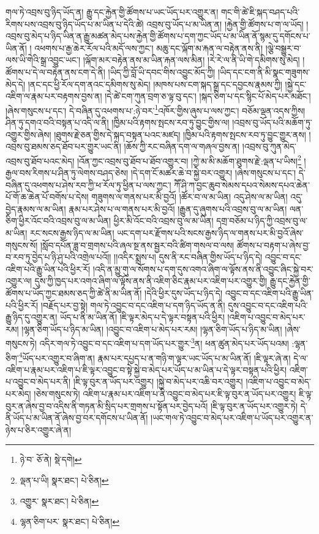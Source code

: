 གལ་ཏེ་འབྲས་བུ་ཉིད་ཡོད་ན། རྒྱུ་དང་རྐྱེན་གྱི་ཚོགས་པ་ཡང་ཡོད་པར་འགྱུར་ན། གང་གི་ཚེ་ཇི་སྐད་བཤད་པའི་རིགས་པས་འབྲས་བུ་ཉིད་ཡོད་པ་མ་ཡིན་པ་དེའི་ཚེ། འབྲས་བུ་ཡོད་པ་མ་ཡིན་ན། །རྐྱེན་གྱི་ཚོགས་པ་ག་ལ་ཡོད། །འབྲས་བུ་མེད་པ་ཉིད་ཡིན་ན་རྒྱུ་མཚན་མེད་པས་རྐྱེན་གྱི་ཚོགས་པ་དག་ཀྱང་ཡོད་པ་མ་ཡིན་ནོ་སྙམ་དུ་དགོངས་པ་ཡིན་ནོ། །
འཕགས་པ་རྒྱ་ཆེར་རོལ་པའི་མདོ་ལས་ཀྱང་། མཆུ་དང་ལྐོག་མ་རྐན་ལ་བརྟེན་ནས་ནི། །ལྕེ་བསྒྱུར་བ་ལས་ཡི་གེའི་སྒྲ་འབྱུང་ཡང་། །ལྐོག་མར་བརྟེན་ནས་མ་ཡིན་རྐན་ལས་མིན། །རེ་རེ་ལ་ནི་ཡི་གེ་དམིགས་སུ་མེད། །ཚོགས་པ་དེ་ལ་བརྟེན་ནས་ངག་དེ་ནི། །ཡིད་ཀྱི་བློ་ཡི་དབང་གིས་འབྱུང་མོད་ཀྱི། །ཡིད་དང་ངག་ནི་མི་སྣང་གཟུགས་མེད་དེ། །ནང་དང་ཕྱི་རོལ་དག་ནའང་དམིགས་སུ་མེད། །མཁས་པས་ངག་སྐད་སྒྲ་དང་དབྱངས་རྣམས་ཀྱི། །སྐྱེ་དང་འཇིག་ལ་རྣམ་པར་བརྟགས་བྱས་ན། །དེ་ཚེ་ངག་ཀུན་བྲག་ཅ་ལྟ་བུ་དང་། །སྐད་ཅིག་པ་དང་སྙིང་པོ་མེད་པར་མཐོང་། །ཞེས་གསུངས་པ་དང་། དེ་བཞིན་དུ་འཕགས་པ་:ཉེ་བར་\footnote{ཉེ་བ་  ཅོ་ནེ།  སྡེ་དགེ། }འཁོར་གྱིས་ཞུས་པ་ལས་ཀྱང་། བཅོམ་ལྡན་འདས་ཀྱིས། ཤིན་ཏུ་དགའ་བའི་བསྟན་པ་འདི་ལ་ནི། །ཁྱིམ་པའི་རྟགས་སྤངས་རབ་ཏུ་བྱུང་གྱིས་ལ། །འབྲས་བུ་ཡོད་པའི་མཆོག་ཏུ་འགྱུར་གྱིས་ཞེས། །ཐུགས་རྗེ་ཅན་གྱིས་དེ་སྐད་བསྟན་པའང་མཛད། །ཁྱིམ་པའི་རྟགས་སྤངས་རབ་ཏུ་བྱུང་གྱུར་ནས། །འབྲས་བུ་ཐམས་ཅད་ཐོབ་པར་གྱུར་ཡང་ནི། །ཆོས་ཀྱི་རང་བཞིན་དག་ལ་གཞལ་བྱས་ན། །འབྲས་བུ་ཀུན་མེད་འབྲས་བུ་ཐོབ་པའང་མེད། །འོན་ཀྱང་འབྲས་བུ་ཐོབ་པ་ཐོབ་འགྱུར་བ། །ཀྱེ་མ་མི་མཆོག་ཐུགས་རྗེ་:ལྡན་པ་ཡིས།\footnote{ལྡན་པ་ཡི།  སྣར་ཐང་།  པེ་ཅིན། } །རྒྱལ་བས་རིགས་པ་ཤིན་ཏུ་ལེགས་བཤད་ཅེས། །དེ་དག་ངོ་མཚར་ཆེ་བ་སྐྱེ་བར་འགྱུར། །ཞེས་གསུངས་པ་དང་། དེ་བཞིན་དུ་འཕགས་པ་ཤེས་རབ་ཀྱི་ཕ་རོལ་ཏུ་ཕྱིན་པ་ལས་ཀྱང་། ཀཽ་ཤི་ཀ་བྱང་ཆུབ་སེམས་དཔའ་སེམས་དཔའ་ཆེན་པོ་གོ་ཆ་ཆེན་པོ་བགོས་པ་དེས། གཟུགས་ལ་གནས་པར་མི་བྱའོ། །ཚོར་བ་ལ་མ་ཡིན། འདུ་ཤེས་ལ་མ་ཡིན། འདུ་བྱེད་རྣམས་ལ་མ་ཡིན། རྣམ་པར་ཤེས་པ་ལ་གནས་པར་མི་བྱའོ། །རྒྱུན་དུ་ཞུགས་པའི་འབྲས་བུ་ལ་མ་ཡིན། ལན་ཅིག་ཕྱིར་འོང་བའི་འབྲས་བུ་ལ་མ་ཡིན། ཕྱིར་མི་འོང་བའི་འབྲས་བུ་ལ་མ་ཡིན། དགྲ་བཅོམ་པ་ཉིད་ཀྱི་འབྲས་བུ་ལ་མ་ཡིན། རང་སངས་རྒྱས་ཉིད་ལ་མ་ཡིན། ཡང་དག་པར་རྫོགས་པའི་སངས་རྒྱས་ཉིད་ལ་གནས་པར་མི་བྱའོ་ཞེས་གསུངས་སོ། །སློབ་དཔོན་ཟླ་བ་གྲགས་པའི་ཞལ་སྔ་ནས་སྦྱར་བའི་ཚིག་གསལ་བ་ལས། ཚོགས་པ་བརྟག་པ་ཞེས་བྱ་བ་རབ་ཏུ་བྱེད་པ་ཉི་ཤུ་པའི་འགྲེལ་པའོ།། །།འདིར་སྨྲས་པ། དུས་ནི་རང་བཞིན་གྱིས་ཡོད་པ་ཉིད་དེ། འབྱུང་བ་དང་འཇིག་པའི་རྒྱུ་ཡིན་པའི་ཕྱིར་རོ། །འདི་ན་མྱུ་གུ་ལ་སོགས་པ་དག་དུས་འགའ་ཞིག་ལ་ལྟོས་ནས་ནི་འབྱུང་ཞིང་སྐྱེ་བར་འགྱུར་ལ། དུས་ཀྱི་ཁྱད་པར་འགའ་ཞིག་ལ་ལྟོས་ནས་ནི་འཇིག་ཅིང་རྣམ་པར་འཇིག་པར་འགྱུར་གྱི། རྒྱུ་དང་རྐྱེན་གྱི་ཚོགས་པ་ཡོད་ཀྱང་ཐམས་ཅད་ཀྱི་ཚེ་ནི་མ་ཡིན་ནོ། །དེའི་ཕྱིར་དུས་ཡོད་པ་ཉིད་དེ། འབྱུང་བ་དང་འཇིག་པའི་རྒྱུ་ཡིན་པའི་ཕྱིར་རོ། །བརྗོད་པར་བྱ་སྟེ། གལ་ཏེ་འབྱུང་བ་དང་འཇིག་པ་དག་ཉིད་ཡོད་ན་ནི། དུས་འབྱུང་བ་དང་འཇིག་པའི་རྒྱུ་ཉིད་དུ་འགྱུར་ན། ཡོད་པ་ནི་མ་ཡིན་ནོ། །ཇི་ལྟར་མེད་པ་དེ་ལྟར་བསྟན་པའི་ཕྱིར། །འཇིག་པ་འབྱུང་བ་མེད་པར་རམ། །ལྷན་ཅིག་ཡོད་པ་ཉིད་མ་ཡིན། །འབྱུང་བ་འཇིག་པ་མེད་པར་རམ། །ལྷན་ཅིག་ཡོད་པ་ཉིད་མ་ཡིན། །ཞེས་གསུངས་ཏེ། འདིར་གལ་ཏེ་འབྱུང་བ་དང་འཇིག་པ་དག་ཡོད་པར་གྱུར་\footnote{འགྱུར་  སྣར་ཐང་།  པེ་ཅིན། }ན། ཕན་ཚུན་མེད་པར་ཡོད་པའམ། :ལྷན་ཅིག་\footnote{ལྷན་ཅིག་པར་  སྣར་ཐང་།  པེ་ཅིན། }ཡོད་པར་འགྱུར་བ་ཞིག་ན། རྣམ་པར་དཔྱད་པ་ན་གཉི་ག་ལྟར་ཡང་ཡོད་པ་མ་ཡིན་ནོ། །ཇི་ལྟར་ཞེ་ན། དེ་ལ་འཇིག་པ་རྣམ་པར་འཇིག་པ་ཇི་ལྟར་འབྱུང་བ་སྟེ་སྐྱེ་བ་མེད་པར་ཡོད་པ་མ་ཡིན་པ་དེ་ལྟར་བསྟན་པའི་ཕྱིར། འཇིག་པ་འབྱུང་བ་མེད་པར་ནི། །ཇི་ལྟ་བུར་ན་ཡོད་པར་འགྱུར། །སྐྱེ་བ་མེད་པར་འཆི་བར་འགྱུར། །འཇིག་པ་འབྱུང་བ་མེད་པར་མེད། །ཅེས་གསུངས་ཏེ། འཇིག་པ་རྣམ་པར་འཇིག་པ་ནི་འབྱུང་བ་མེད་པར་ཇི་ལྟ་བུར་ན་ཡོད་པར་འགྱུར། ཇི་ལྟ་བུར་ན་ཞེས་བྱ་བ་འདིས་ནི་གཏན་མི་སྲིད་པར་གྲགས་པ་སྟོན་པར་བྱེད་པའོ། །ཇི་ལྟ་བུར་ན་ཡོད་པར་འགྱུར་ཏེ། དེ་ནི་ཡོད་པ་མ་ཡིན་ནོ་ཞེས་བྱ་བར་དགོངས་པ་ཡིན་ནོ། །ཡང་གལ་ཏེ་འབྱུང་བ་མེད་པར་འཇིག་པ་ཡོད་པར་འགྱུར་ན་ཉེས་པ་ཅིར་འགྱུར་ཞེ་ན། 